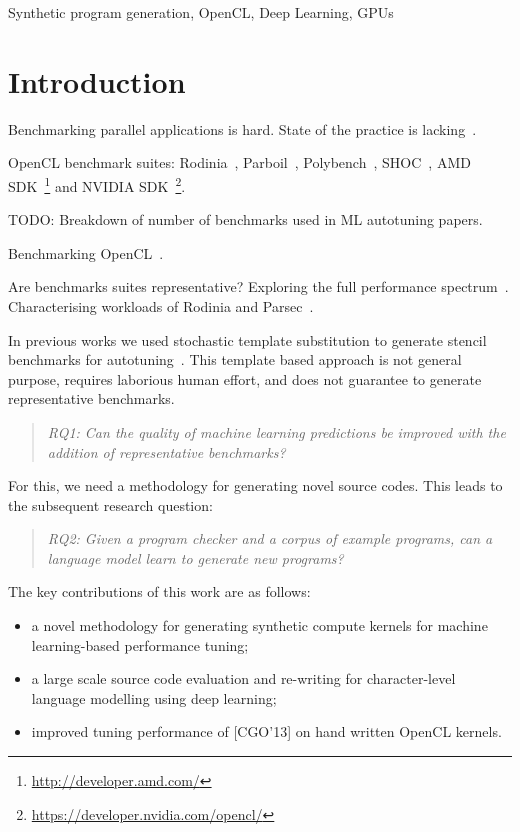 \documentclass[preprint,nonatbib,10pt,nocopyrightspace]{sigplanconf}
\begin{document}


\keywords
Synthetic program generation, %
OpenCL, %
Deep Learning, %
GPUs

\section{Introduction}\label{sec:introduction}

Benchmarking parallel applications is hard. State of the practice is
lacking~\cite{Belli2015}.

OpenCL benchmark suites: %
Rodinia~\cite{Che2009}, %
Parboil~\cite{Stratton2012}, %
Polybench~\cite{Grauer-Gray2012}, %
SHOC~\cite{Danalis2010}, %
AMD SDK~\footnote{\url{http://developer.amd.com/}} %
and NVIDIA SDK~\footnote{\url{https://developer.nvidia.com/opencl/}}.

TODO: Breakdown of number of benchmarks used in ML autotuning papers.

Benchmarking OpenCL~\cite{Tobergte2013a}.

Are benchmarks suites representative? Exploring the full performance
spectrum~\cite{Ryoo2015}. Characterising workloads of Rodinia and
Parsec~\cite{Che2010}.

In previous works we used stochastic template substitution to generate
stencil benchmarks for
autotuning~\cite{Cummins2015a,Cummins2016}. This template based
approach is not general purpose, requires laborious human effort, and
does not guarantee to generate representative benchmarks.

\begin{quote}
  \emph{RQ1: Can the quality of machine learning predictions be
    improved with the addition of representative benchmarks?}
\end{quote}

For this, we need a methodology for generating novel source
codes. This leads to the subsequent research question:

\begin{quote}
  \emph{RQ2: Given a program checker and a corpus of example programs,
    can a language model learn to generate new programs?}
\end{quote}

\noindent
The key contributions of this work are as follows:%
\begin{itemize}
\item a novel methodology for generating synthetic compute kernels for
  machine learning-based performance tuning;
\item a large scale source code evaluation and re-writing for
  character-level language modelling using deep learning;
\item improved tuning performance of [CGO'13] on hand written OpenCL
  kernels.
\end{itemize}
\end{document}

